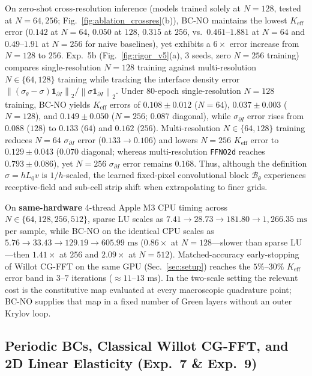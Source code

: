 \documentclass[preprint,11pt]{elsarticle}
\newcommand{\Keff}{K_{\mathrm{eff}}}
\newcommand{\norm}[1]{\left\lVert #1 \right\rVert}
\begin{document}
On zero-shot cross-resolution inference (models trained solely at $N=128$, tested at $N=64, 256$; Fig.~\ref{fig:ablation_crossres}(b)), BC-NO maintains the lowest $\Keff$ error ($0.142$ at $N=64$, $0.050$ at $128$, $0.315$ at $256$, vs.\ $0.461$--$1.881$ at $N=64$ and $0.49$--$1.91$ at $N=256$ for naive baselines), yet exhibits a $6\times$ error increase from $N=128$ to $256$. Exp.~5b (Fig.~\ref{fig:rigor_v5}(a), 3 seeds, zero $N=256$ training) compares single-resolution $N=128$ training against multi-resolution $N\in\{64,128\}$ training while tracking the interface density error $\norm{(\sigma_\theta - \sigma)\mathbf{1}_{\partial I}}_2 / \norm{\sigma\mathbf{1}_{\partial I}}_2$. Under $80$-epoch single-resolution $N=128$ training, BC-NO yields $\Keff$ errors of $0.108\pm 0.012$ ($N=64$), $0.037\pm 0.003$ ($N=128$), and $0.149\pm 0.050$ ($N=256$; $0.087$ diagonal), while $\sigma_{\partial I}$ error rises from $0.088$ ($128$) to $0.133$ ($64$) and $0.162$ ($256$). Multi-resolution $N\in\{64,128\}$ training reduces $N=64$ $\sigma_{\partial I}$ error ($0.133\to 0.106$) and lowers $N=256$ $\Keff$ error to $0.129\pm 0.043$ ($0.070$ diagonal; whereas multi-resolution \texttt{FFNO2d} reaches $0.793\pm 0.086$), yet $N=256$ $\sigma_{\partial I}$ error remains $0.168$. Thus, although the definition $\sigma = h L_0 v$ is $1/h$-scaled, the learned fixed-pixel convolutional block $\mathcal{B}_\theta$ experiences receptive-field and sub-cell strip shift when extrapolating to finer grids.

On \textbf{same-hardware} 4-thread Apple M3 CPU timing across $N \in \{64, 128, 256, 512\}$, sparse LU scales as $7.41 \to 28.73 \to 181.80 \to 1{,}266.35\text{ ms}$ per sample, while BC-NO on the identical CPU scales as $5.76 \to 33.43 \to 129.19 \to 605.99\text{ ms}$ ($0.86\times$ at $N=128$---slower than sparse LU---then $1.41\times$ at $256$ and $2.09\times$ at $N=512$). Matched-accuracy early-stopping of Willot CG-FFT on the same GPU (Sec.~\ref{sec:setup}) reaches the $5\%$--$30\%$ $\Keff$ error band in $3$--$7$ iterations ($\approx 11$--$13\text{ ms}$). In the two-scale setting the relevant cost is the constitutive map evaluated at every macroscopic quadrature point; BC-NO supplies that map in a fixed number of Green layers without an outer Krylov loop.

\subsection{Periodic BCs, Classical Willot CG-FFT, and 2D Linear Elasticity (Exp.~7 \& Exp.~9)}\label{sec:exp_pbc_elas}
\end{document}
